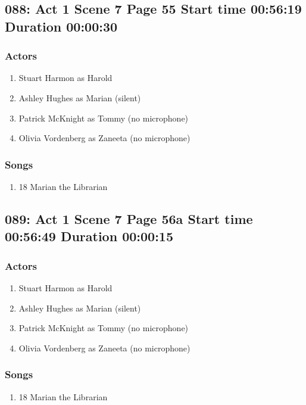 \subsection{088: Act 1 Scene 7 Page 55 Start time 00:56:19 Duration 00:00:30}

\subsubsection{Actors}
\begin{enumerate}
\item Stuart Harmon as Harold
\item Ashley Hughes as Marian (silent)
\item Patrick McKnight as Tommy (no microphone)
\item Olivia Vordenberg as Zaneeta (no microphone)
\end{enumerate}

\subsubsection{Songs}
\begin{enumerate}
\item 18 Marian the Librarian
\end{enumerate}
\subsection{089: Act 1 Scene 7 Page 56a Start time 00:56:49 Duration 00:00:15}

\subsubsection{Actors}
\begin{enumerate}
\item Stuart Harmon as Harold
\item Ashley Hughes as Marian (silent)
\item Patrick McKnight as Tommy (no microphone)
\item Olivia Vordenberg as Zaneeta (no microphone)
\end{enumerate}

\subsubsection{Songs}
\begin{enumerate}
\item 18 Marian the Librarian
\end{enumerate}

